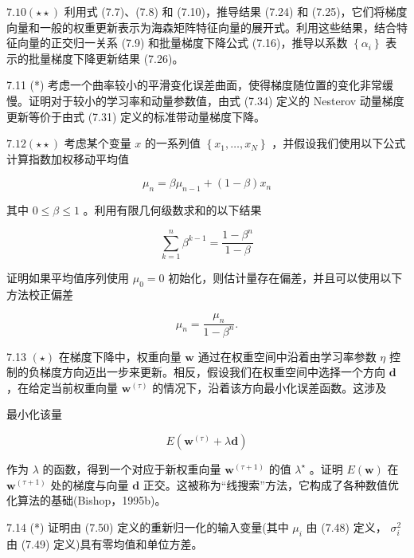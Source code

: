 \documentclass[10pt]{report}
\begin{document}
\({7.10}\left( {\star  \star  }\right)\) 利用式 (7.7)、(7.8) 和 (7.10)，推导结果 (7.24) 和 (7.25)，它们将梯度向量和一般的权重更新表示为海森矩阵特征向量的展开式。利用这些结果，结合特征向量的正交归一关系 (7.9) 和批量梯度下降公式 (7.16)，推导以系数 \(\left\{  {\alpha }_{i}\right\}\) 表示的批量梯度下降更新结果 (7.26)。

7.11 (*) 考虑一个曲率较小的平滑变化误差曲面，使得梯度随位置的变化非常缓慢。证明对于较小的学习率和动量参数值，由式 (7.34) 定义的 Nesterov 动量梯度更新等价于由式 (7.31) 定义的标准带动量梯度下降。

\({7.12}\left( {\star  \star  }\right)\) 考虑某个变量 \(x\) 的一系列值 \(\left\{  {{x}_{1},\ldots ,{x}_{N}}\right\}\) ，并假设我们使用以下公式计算指数加权移动平均值

\[
{\mu }_{n} = \beta {\mu }_{n - 1} + \left( {1 - \beta }\right) {x}_{n} \tag{7.66}
\]

其中 \(0 \leq  \beta  \leq  1\) 。利用有限几何级数求和的以下结果

\[
\mathop{\sum }\limits_{{k = 1}}^{n}{\beta }^{k - 1} = \frac{1 - {\beta }^{n}}{1 - \beta } \tag{7.67}
\]

证明如果平均值序列使用 \({\mu }_{0} = 0\) 初始化，则估计量存在偏差，并且可以使用以下方法校正偏差

\[
{\widehat{\mu }}_{n} = \frac{{\mu }_{n}}{1 - {\beta }^{n}}. \tag{7.68}
\]

7.13 \(\left( \star \right)\) 在梯度下降中，权重向量 \(\mathbf{w}\) 通过在权重空间中沿着由学习率参数 \(\eta\) 控制的负梯度方向迈出一步来更新。相反，假设我们在权重空间中选择一个方向 \(\mathbf{d}\) ，在给定当前权重向量 \({\mathbf{w}}^{\left( \tau \right) }\) 的情况下，沿着该方向最小化误差函数。这涉及

最小化该量

\[
E\left( {{\mathbf{w}}^{\left( \tau \right) } + \lambda \mathbf{d}}\right)  \tag{7.69}
\]

作为 \(\lambda\) 的函数，得到一个对应于新权重向量 \({\mathbf{w}}^{\left( \tau  + 1\right) }\) 的值 \({\lambda }^{ \star  }\) 。证明 \(E\left( \mathbf{w}\right)\) 在 \({\mathbf{w}}^{\left( \tau  + 1\right) }\) 处的梯度与向量 \(\mathbf{d}\) 正交。这被称为“线搜索”方法，它构成了各种数值优化算法的基础(Bishop，1995b)。

7.14 (*) 证明由 (7.50) 定义的重新归一化的输入变量(其中 \({\mu }_{i}\) 由 (7.48) 定义， \({\sigma }_{i}^{2}\) 由 (7.49) 定义)具有零均值和单位方差。
\end{document}
